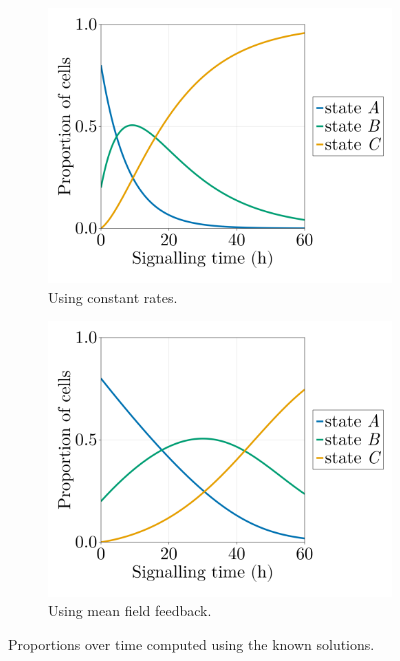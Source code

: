 \begin{figure}[ht]
    \centering
    \begin{subfigure}{0.47\textwidth}
        \centering
        \includegraphics[width=\textwidth]{figures/405/405-proportions-solution-constant.png}
        \caption{Using constant rates.}
    \end{subfigure}
    \hfill
    \begin{subfigure}{0.47\textwidth}
        \centering
        \includegraphics[width=\textwidth]{figures/405/405-proportions-solution-meanfield.png}
        \caption{Using mean field feedback.}
    \end{subfigure}
    \caption{Proportions over time computed using the known solutions.}
    \label{fig:prop-solutions}
\end{figure}

